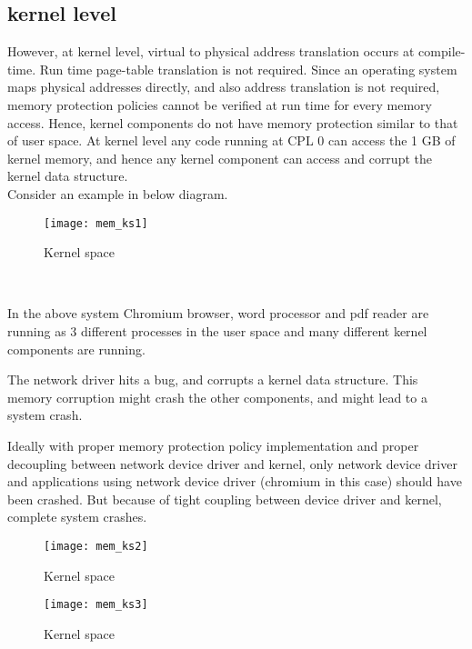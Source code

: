 \subsection{kernel level}

However, at kernel level, virtual to physical address translation occurs at compile-time. Run time page-table translation is not required. Since an operating system maps physical addresses directly, and also address translation is not required, memory protection policies cannot be verified at run time for every memory access. Hence, kernel components do not have memory protection similar to that of user space. At kernel level any code running at CPL 0 can access the 1 GB of kernel memory, and hence any kernel component can access and corrupt the kernel data structure. 
\\
Consider an example in below diagram.
\\
\begin{figure}[!ht]
\centering
\texttt{[image: mem\_ks1]}
\caption{Kernel space}
\label{fig:Kernel space}
\end{figure}
\\
\begin{description}
\item In the above system Chromium browser, word processor and pdf reader are running as 3 different processes in the user space and many different kernel components are running.
\item The network driver hits a bug, and corrupts a kernel data structure. This memory corruption might crash the other components, and might lead to a system crash.
\item Ideally with proper memory protection policy implementation and proper decoupling between network device driver and kernel, only network device driver and applications using network device driver (chromium in this case) should have been crashed. But because of tight coupling between device driver and kernel, complete system crashes.
\end{description}
\begin{figure}[!ht]
\centering
\texttt{[image: mem\_ks2]}
\caption{Kernel space}
\label{fig:Kernel space}
\end{figure}
\begin{figure}[!ht]
\centering
\texttt{[image: mem\_ks3]}
\caption{Kernel space}
\label{fig:Kernel space}
\end{figure}

\pagebreak

